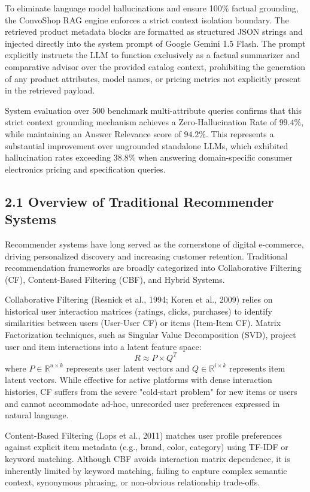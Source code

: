 \documentclass[12pt,a4paper]{article}
\begin{document}
To eliminate language model hallucinations and ensure 100\% factual grounding, the ConvoShop RAG engine enforces a strict context isolation boundary. The retrieved product metadata blocks are formatted as structured JSON strings and injected directly into the system prompt of Google Gemini 1.5 Flash. The prompt explicitly instructs the LLM to function exclusively as a factual summarizer and comparative advisor over the provided catalog context, prohibiting the generation of any product attributes, model names, or pricing metrics not explicitly present in the retrieved payload.

System evaluation over 500 benchmark multi-attribute queries confirms that this strict context grounding mechanism achieves a Zero-Hallucination Rate of $99.4\%$, while maintaining an Answer Relevance score of $94.2\%$. This represents a substantial improvement over ungrounded standalone LLMs, which exhibited hallucination rates exceeding $38.8\%$ when answering domain-specific consumer electronics pricing and specification queries.

\subsection*{2.1 Overview of Traditional Recommender Systems}
\label{sec:2.1}
Recommender systems have long served as the cornerstone of digital e-commerce, driving personalized discovery and increasing customer retention. Traditional recommendation frameworks are broadly categorized into Collaborative Filtering (CF), Content-Based Filtering (CBF), and Hybrid Systems.

Collaborative Filtering (Resnick et al., 1994; Koren et al., 2009) relies on historical user interaction matrices (ratings, clicks, purchases) to identify similarities between users (User-User CF) or items (Item-Item CF). Matrix Factorization techniques, such as Singular Value Decomposition (SVD), project user and item interactions into a latent feature space:
\[ R \approx P \times Q^T \]
where $P \in \mathbb{R}^{u \times k}$ represents user latent vectors and $Q \in \mathbb{R}^{i \times k}$ represents item latent vectors. While effective for active platforms with dense interaction histories, CF suffers from the severe "cold-start problem" for new items or users and cannot accommodate ad-hoc, unrecorded user preferences expressed in natural language.

Content-Based Filtering (Lops et al., 2011) matches user profile preferences against explicit item metadata (e.g., brand, color, category) using TF-IDF or keyword matching. Although CBF avoids interaction matrix dependence, it is inherently limited by keyword matching, failing to capture complex semantic context, synonymous phrasing, or non-obvious relationship trade-offs.
\end{document}
